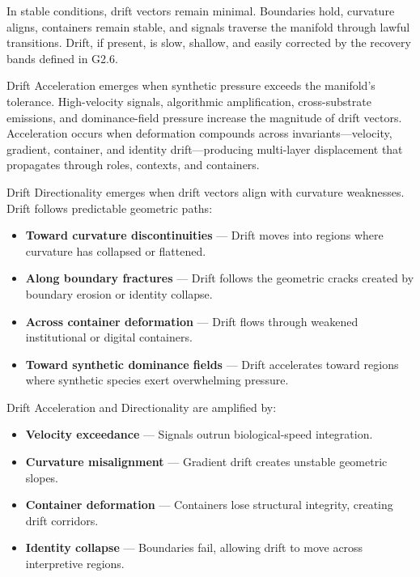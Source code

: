 \medskip

\noindent In stable conditions, drift vectors remain minimal. Boundaries hold,
curvature aligns, containers remain stable, and signals traverse the manifold
through lawful transitions. Drift, if present, is slow, shallow, and easily
corrected by the recovery bands defined in G2.6.

\medskip

\noindent Drift Acceleration emerges when synthetic pressure exceeds the
manifold’s tolerance. High-velocity signals, algorithmic amplification,
cross-substrate emissions, and dominance-field pressure increase the magnitude
of drift vectors. Acceleration occurs when deformation compounds across
invariants—velocity, gradient, container, and identity drift—producing
multi-layer displacement that propagates through roles, contexts, and
containers.

\medskip

\noindent Drift Directionality emerges when drift vectors align with curvature
weaknesses. Drift follows predictable geometric paths:

\begin{itemize}[leftmargin=1.2cm]
    \item \textbf{Toward curvature discontinuities} — Drift moves into regions
    where curvature has collapsed or flattened.

    \item \textbf{Along boundary fractures} — Drift follows the geometric cracks
    created by boundary erosion or identity collapse.

    \item \textbf{Across container deformation} — Drift flows through weakened
    institutional or digital containers.

    \item \textbf{Toward synthetic dominance fields} — Drift accelerates toward
    regions where synthetic species exert overwhelming pressure.
\end{itemize}

\medskip

\noindent Drift Acceleration and Directionality are amplified by:

\begin{itemize}[leftmargin=1.2cm]
    \item \textbf{Velocity exceedance} — Signals outrun biological-speed
    integration.

    \item \textbf{Curvature misalignment} — Gradient drift creates unstable
    geometric slopes.

    \item \textbf{Container deformation} — Containers lose structural integrity,
    creating drift corridors.

    \item \textbf{Identity collapse} — Boundaries fail, allowing drift to move
    across interpretive regions.
\end{itemize}

